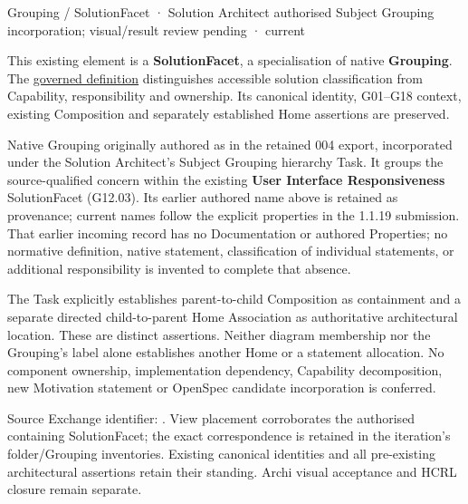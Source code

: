 \label{element:4643d0b24fe7420b8e3fd0f4a2f4b1de}
{\small Grouping / SolutionFacet · Solution Architect authorised Subject Grouping incorporation; visual/result review pending · current}\par

This existing element is a \textbf{SolutionFacet}, a specialisation of native
\textbf{Grouping}. The \href{\detokenize{../../../../../../../governance/continuum-representation.md#solutionfacet-classification--1119-candidate}}{governed definition}
distinguishes accessible solution classification from Capability, responsibility
and ownership. Its canonical identity, G01–G18 context, existing Composition
and separately established Home assertions are preserved.



Native Grouping originally authored as \texttt{} in the retained 004 export,
incorporated under the Solution Architect's Subject Grouping hierarchy Task.
It groups the source-qualified \texttt{} concern within
the existing \textbf{User Interface Responsiveness} SolutionFacet (G12.03). Its earlier authored name above is retained as provenance; current names
follow the explicit properties in the 1.1.19 submission.
That earlier incoming record has no Documentation or authored Properties; no normative
definition, native statement, classification of individual statements, or
additional responsibility is invented to complete that absence.



The Task explicitly establishes parent-to-child Composition as containment and
a separate directed child-to-parent Home Association as authoritative architectural
location. These are distinct assertions. Neither diagram membership nor the
Grouping's label alone establishes another Home or a statement allocation.
No component ownership, implementation dependency, Capability decomposition,
new Motivation statement or OpenSpec candidate incorporation is conferred.



Source Exchange identifier: \texttt{}. View placement corroborates
the authorised containing SolutionFacet; the exact correspondence is retained in the
iteration's folder/Grouping inventories. Existing canonical identities and all
pre-existing architectural assertions retain their standing. Archi visual
acceptance and HCRL closure remain separate.


